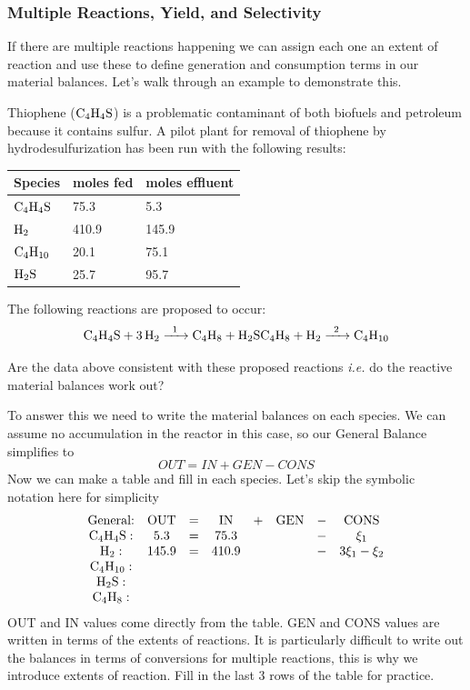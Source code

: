 \documentclass[
]{article}
\begin{document}
\hypertarget{multiple-reactions-yield-and-selectivity}{%
\subsubsection{Multiple Reactions, Yield, and Selectivity}\label{multiple-reactions-yield-and-selectivity}}

If there are multiple reactions happening we can assign each one an extent of reaction and use these to define generation and consumption terms in our material balances. Let's walk through an example to demonstrate this.

Thiophene (\(\ce{C4H4S}\)) is a problematic contaminant of both biofuels and petroleum because it contains sulfur. A pilot plant for removal of thiophene by hydrodesulfurization has been run with the following results:

\begin{longtable}[]{@{}lll@{}}
\toprule\noalign{}
Species & moles fed & moles effluent \\
\midrule\noalign{}
\endhead
\bottomrule\noalign{}
\endlastfoot
\(\ce{C4H4S}\) & 75.3 & 5.3 \\
\(\ce{H2}\) & 410.9 & 145.9 \\
\(\ce{C4H10}\) & 20.1 & 75.1 \\
\(\ce{H2S}\) & 25.7 & 95.7 \\
\end{longtable}

The following reactions are proposed to occur:
\[\ce{C4H4S + 3H2 ->[1] C4H8 + H2S} \\
\ce{C4H8 + H2 ->[2] C4H10}\]

Are the data above consistent with these proposed reactions \emph{i.e.} do the reactive material balances work out?

To answer this we need to write the material balances on each species. We can assume no accumulation in the reactor in this case, so our General Balance simplifies to
\[OUT = IN + GEN - CONS\]
Now we can make a table and fill in each species. Let's skip the symbolic notation here for simplicity
\[
\begin{array}{cccccccc}
  \text{General:} &\text{OUT}& = & \text{IN} & + & \text{GEN} & - & \text{CONS} \\ 
  \ce{C4H4S}: & 5.3 &=& 75.3 &&&-& \xi_1  \\
  \ce{H2}:& 145.9 &=& 410.9 &&&-& 3\xi_1 - \xi_2 \\
  \ce{C4H10}:& \\
  \ce{H2S}: \\
  \ce{C4H8}:
\end{array}
\]
OUT and IN values come directly from the table. GEN and CONS values are written in terms of the extents of reactions. It is particularly difficult to write out the balances in terms of conversions for multiple reactions, this is why we introduce extents of reaction. Fill in the last 3 rows of the table for practice.
\end{document}
